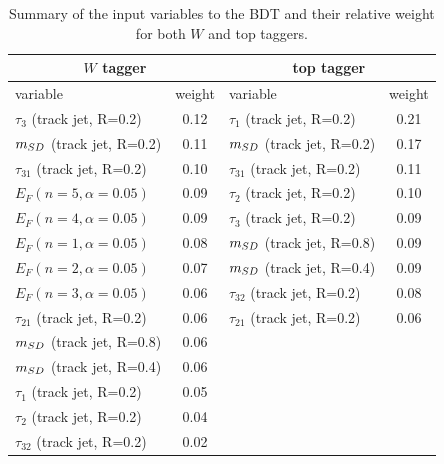 \documentclass[a4paper,11pt]{article}
\begin{document}
\begin{table}[!htb]\centering
\begin{tabular}{| l | c | l | c |}
\hline
  \multicolumn{2}{|c|}{$W$ tagger}  & \multicolumn{2}{c|}{top tagger} \\
  \hline
 variable & weight & variable & weight \\
\hline
 $\tau_3$ (track jet, R=0.2)      & 0.12      & $\tau_1$ (track jet, R=0.2) & 0.21  \\
 $m_{SD}$  (track jet, R=0.2)      & 0.11      & $m_{SD}$  (track jet, R=0.2) & 0.17 \\
 $\tau_{31}$  (track jet, R=0.2) & 0.10     & $\tau_{31}$  (track jet, R=0.2)  & 0.11 \\
 $E_{F}(n=5,\alpha=0.05)$                               & 0.09     &  $\tau_2$ (track jet, R=0.2) & 0.10 \\
 $E_{F}(n=4,\alpha=0.05)$                               & 0.09     & $\tau_3$ (track jet, R=0.2) & 0.09 \\
 $E_{F}(n=1,\alpha=0.05)$                               & 0.08     & $m_{SD}$  (track jet, R=0.8)& 0.09 \\
 $E_{F}(n=2,\alpha=0.05)$                               & 0.07     &  $m_{SD}$  (track jet, R=0.4) & 0.09 \\
 $E_{F}(n=3,\alpha=0.05)$                               & 0.06     & $\tau_{32}$  (track jet, R=0.2) & 0.08 \\
 $\tau_{21}$  (track jet, R=0.2)& 0.06   & $\tau_{21}$  (track jet, R=0.2) & 0.06 \\
 $m_{SD}$  (track jet, R=0.8) & 0.06 &  &\\
 $m_{SD}$  (track jet, R=0.4) & 0.06 & & \\
 $\tau_1$ (track jet, R=0.2) & 0.05      &  &\\
 $\tau_2$ (track jet, R=0.2) & 0.04      &  &\\
 $\tau_{32}$  (track jet, R=0.2) & 0.02    &  &\\
\hline
\end{tabular}
\caption{Summary of the input variables to the BDT and their relative weight for both $W$ and top taggers. }
\label{tab:TMVA_summary}
\end{table}
\end{document}

